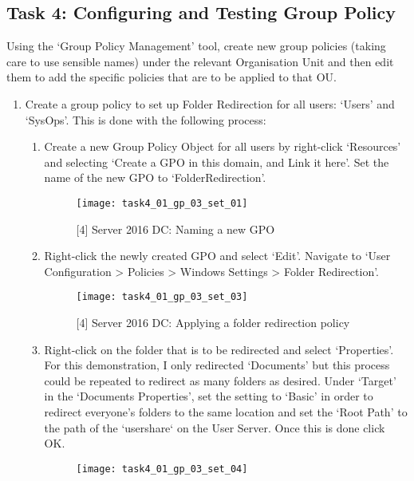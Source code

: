 \pagebreak
\subsection{Task 4: Configuring and Testing Group Policy}
Using the `Group Policy Management' tool, create new group policies (taking care to use sensible names) under the relevant Organisation Unit and then edit them to add the specific policies that are to be applied to that OU.

\begin{enumerate}[series=task4methodology1]
  \item Create a group policy to set up Folder Redirection for all users: `Users' and `SysOps'. This is done with the following process:
    \begin{enumerate}[label=(\alph*)]
      \item Create a new Group Policy Object for all users by right-click `Resources' and selecting `Create a GPO in this domain, and Link it here'. Set the name of the new GPO to `FolderRedirection'.
        \begin{figure}[H]
          \centering
          \captionsetup{skip=2pt}
          \texttt{[image: task4\_01\_gp\_03\_set\_01]}
          \caption{[4] Server 2016 DC: Naming a new GPO}
          \label{fig:task4:gp3a1}
        \end{figure}
      \item Right-click the newly created GPO and select `Edit'. Navigate to `User Configuration > Policies > Windows Settings > Folder Redirection'.
        \begin{figure}[H]
          \centering
          \captionsetup{skip=2pt}
          \texttt{[image: task4\_01\_gp\_03\_set\_03]}
          \caption{[4] Server 2016 DC: Applying a folder redirection policy}
          \label{fig:task4:gp3a3}
        \end{figure}
      \item Right-click on the folder that is to be redirected and select `Properties'. For this demonstration, I only redirected `Documents' but this process could be repeated to redirect as many folders as desired. Under `Target' in the `Documents Properties', set the setting to `Basic' in order to redirect everyone's folders to the same location and set the `Root Path' to the path of the `usershare` on the User Server. Once this is done click OK.
        \begin{figure}[H]
          \centering
          \captionsetup{skip=2pt}
          \texttt{[image: task4\_01\_gp\_03\_set\_04]}

\end{figure}
\end{enumerate}
\end{enumerate}
